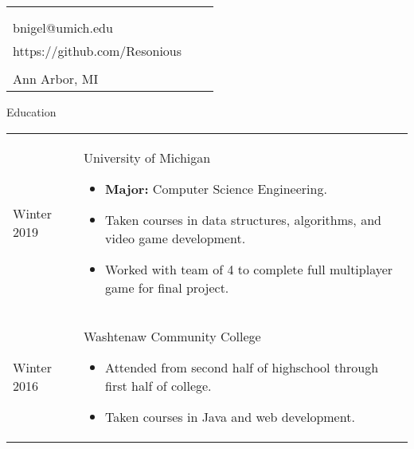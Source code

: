 \documentclass[11pt]{article}
\makeatletter
\def \address{2287 S. Main St.\\Ann Arbor, MI}
\def \author{Nigel Baillie}
\def \email{bnigel@umich.edu}
\def \phonenumber{(734) 678-5328}
\def \bday{Born April $11^{\text{th}}$ 1995}
\def \github{https://github.com/Resonious}
\renewcommand{\section}[1]{{\Huge{#1}}\vspace{2 mm}}
\newenvironment{timeline}
        {\begin{tabular}{p{21 mm}|p{150 mm}}}
        {\end{tabular}}
\newenvironment{timelinetitle}
        {\vspace{-2 mm}\begin{large}}
        {\end{large}\vspace{-1.5 mm}}
\newcommand{\timespan}[2]{{#2}\newline{#1}}
\makeatother
\begin{document}
\newlength{\rcollength}\setlength{\rcollength}{3.0in}%
\begin{tabular} {
  p{}
  p{}
  p{}
}
  \begin{flushleft}
    {\Huge{\author}}\\
    \vspace{1.5 mm}
  \end{flushleft}
  &
  \begin{center}
    {\phonenumber}\\
    {\email}\\
    {\github}
  \end{center}
  &
  \begin{flushright}
    {\bday}\\
    {\address}
  \end{flushright}
\end{tabular}

\section{Education}

\begin{timeline}
\timespan{Fall 2016}{Winter 2019}
&
\begin{timelinetitle}
    University of Michigan
\end{timelinetitle}
\begin{itemize}
  \item \textbf{Major:} Computer Science Engineering.
  \item Taken courses in data structures, algorithms, and video game development.
  \item Worked with team of 4 to complete full multiplayer game for final project.
\end{itemize}

\\

\timespan{Fall 2012}{Winter 2016}
&
\begin{timelinetitle}
    Washtenaw Community College
\end{timelinetitle}
\begin{itemize}
  \item Attended from second half of highschool through first half of college.
  \item Taken courses in Java and web development.
\end{itemize}

\end{timeline}
\end{document}
